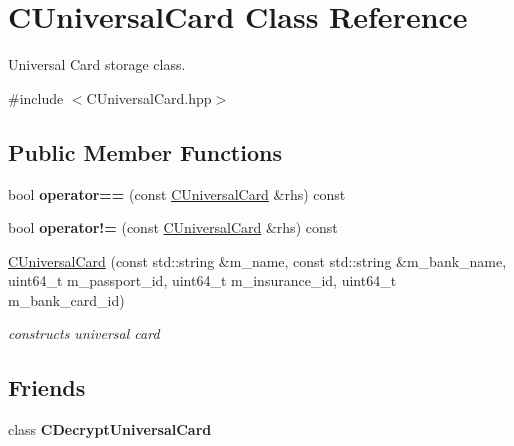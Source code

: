 \hypertarget{classCUniversalCard}{}\section{C\+Universal\+Card Class Reference}
\label{classCUniversalCard}


Universal Card storage class.  




{\ttfamily \#include $<$C\+Universal\+Card.\+hpp$>$}

\subsection*{Public Member Functions}
\begin{DoxyCompactItemize}
\item 
bool {\bfseries operator==} (const \hyperlink{classCUniversalCard}{C\+Universal\+Card} \&rhs) const \hypertarget{classCUniversalCard_a074e502f323b864d3052e9b4aa461ec9}{}\label{classCUniversalCard_a074e502f323b864d3052e9b4aa461ec9}

\item 
bool {\bfseries operator!=} (const \hyperlink{classCUniversalCard}{C\+Universal\+Card} \&rhs) const \hypertarget{classCUniversalCard_a32dd7e165cc549f566cab21c8f31847a}{}\label{classCUniversalCard_a32dd7e165cc549f566cab21c8f31847a}

\item 
\hyperlink{classCUniversalCard_a427be696b12079636d4ac259acd2465b}{C\+Universal\+Card} (const std\+::string \&m\+\_\+name, const std\+::string \&m\+\_\+bank\+\_\+name, uint64\+\_\+t m\+\_\+passport\+\_\+id, uint64\+\_\+t m\+\_\+insurance\+\_\+id, uint64\+\_\+t m\+\_\+bank\+\_\+card\+\_\+id)
\begin{DoxyCompactList}\small\item\em constructs universal card \end{DoxyCompactList}\end{DoxyCompactItemize}
\subsection*{Friends}
\begin{DoxyCompactItemize}
\item 
class {\bfseries C\+Decrypt\+Universal\+Card}\hypertarget{classCUniversalCard_a1e95885d1edb5bb4c251953d589aafee}{}\label{classCUniversalCard_a1e95885d1edb5bb4c251953d589aafee}

\end{DoxyCompactItemize}


